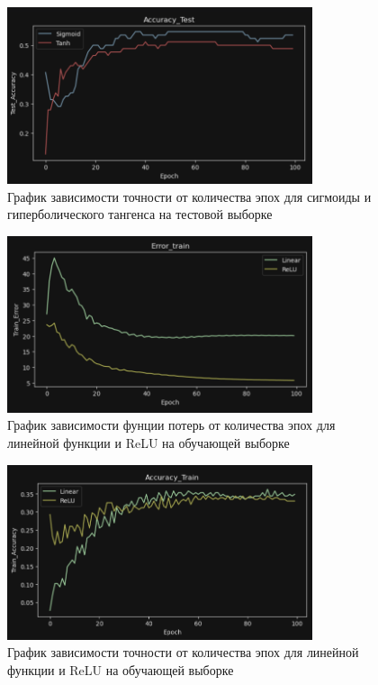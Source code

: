 \documentclass[a4paper, 14pt]{extarticle}
\begin{document}
\begin{figure}[H]
\centering
\includegraphics[width=0.8\textwidth]{images/res4.png}
\caption{График зависимости точности от количества эпох для сигмоиды и гиперболического тангенса на тестовой выборке}
\label{fig:img4}
\end{figure}


\begin{figure}[H]
\centering
\includegraphics[width=0.8\textwidth]{images/res5.png}
\caption{График зависимости фунции потерь от количества эпох для линейной функции и ReLU на обучающей выборке}
\label{fig:img5}
\end{figure}


\begin{figure}[H]
\centering
\includegraphics[width=0.8\textwidth]{images/res6.png}
\caption{График зависимости точности от количества эпох для линейной функции и ReLU на обучающей выборке}
\label{fig:img6}
\end{figure}
\end{document}
